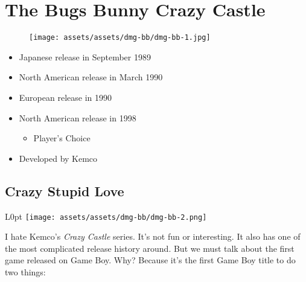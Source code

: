 \documentclass{book}
\begin{document}
\begingroup \chapter*{The Bugs Bunny Crazy Castle} \endgroup
\begin{figure}[H]
\vskip 4pt
\centering
\texttt{[image: assets/assets/dmg-bb/dmg-bb-1.jpg]}\end{figure}
\begin{itemize} [nosep]




\item Japanese release in September 1989







\item North American release in March 1990







\item European release in 1990







\item North American release in 1998
\begin{itemize} [nosep]\item Player’s Choice\end{itemize}\noindent











\item Developed by Kemco

\end{itemize}\noindent

\newpage\FloatBarrier\needspace{10mm}\section*{Crazy Stupid Love}\nopagebreak[4]
\begin{wrapfigure}{L}{0pt} \texttt{[image: assets/assets/dmg-bb/dmg-bb-2.png]}\end{wrapfigure}
I hate Kemco’s \emph{Crazy Castle} series. It’s not fun or interesting. It also has one of the most complicated release history around. But we must talk about the first game released on Game Boy. Why? Because it’s the first Game Boy title to do two things:
\end{document}
